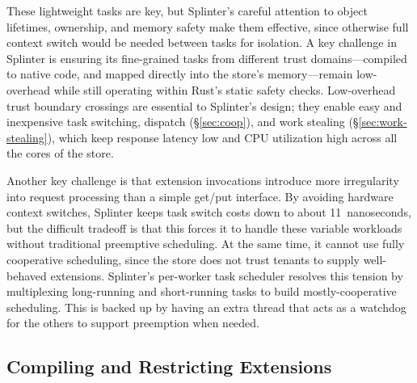 These lightweight tasks are key, but Splinter's careful attention to object lifetimes, ownership, and memory safety
  make them effective, since otherwise full context switch would be needed between
  tasks for isolation.
A key challenge in Splinter is ensuring its fine-grained tasks from different
  trust domains---compiled to native code, and mapped directly into
  the store's memory---remain low-overhead while still operating within Rust's static
  safety checks.
Low-overhead trust boundary crossings are essential to Splinter's
  design;
they enable easy and inexpensive task switching, dispatch
(\S\ref{sec:coop}), and work stealing (\S\ref{sec:work-stealing}),
  which keep response latency low and CPU utilization high across all the cores
  of the store.


Another key challenge is that extension invocations introduce more irregularity into request processing
  than a simple get/put interface.
By avoiding hardware context switches, Splinter keeps task switch costs down
    to about 11~nanoseconds, but the difficult tradeoff is that this forces
    it to handle these variable workloads without traditional
    preemptive scheduling.
At the same time, it cannot use fully cooperative scheduling, since the store
    does not trust tenants to supply well-behaved extensions.
Splinter's per-worker task scheduler resolves this tension by multiplexing
    long-running and short-running tasks to
    build mostly-cooperative scheduling.
This is backed up by having an extra thread that acts as a watchdog for the others to support
    preemption when needed.

\subsection{Compiling and Restricting Extensions}
\label{sec:compile}

